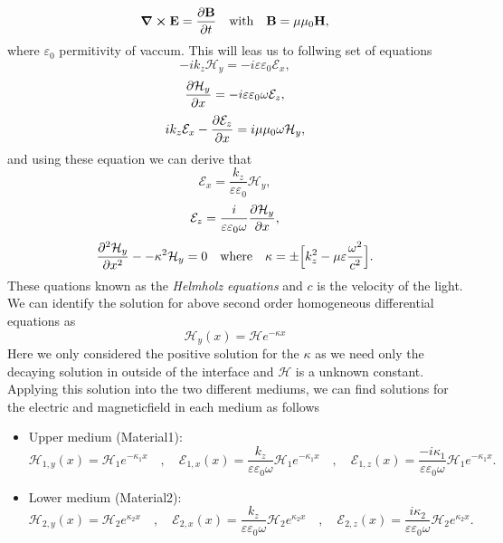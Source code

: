 \documentclass[a4paper]{article}
\numberwithin{equation}{subsection}
\numberwithin{equation}{section}
\begin{document}
\begin{equation}
  \curl{\vb{E}} = \pdv{\vb{B}}{t}\quad \text{with} \quad
  \vb{B} = \mu \mu_0 \vb{H},
\end{equation}
where $\varepsilon_0$ permitivity of vaccum. This will leas us to follwing set of equations
\begin{equation}
  -ik_z \mathcal{H}_y = -i \varepsilon \varepsilon_0 \mathcal{E}_x,
\end{equation}
\begin{equation}
  \pdv{\mathcal{H}_y}{x} = -i \varepsilon \varepsilon_0 \omega \mathcal{E}_z,
\end{equation}
\begin{equation}
  ik_z \mathcal{E}_x - \pdv{\mathcal{E}_z}{x} =
  i \mu \mu_0 \omega \mathcal{H}_y,
\end{equation}
and using these equation we can derive that
\begin{equation}
  \mathcal{E}_x = \frac{k_z }{\varepsilon \varepsilon_0} \mathcal{H}_y,
\end{equation}
\begin{equation}
  \mathcal{E}_z = \frac{i}{\varepsilon \varepsilon_0 \omega}
  \pdv{\mathcal{H}_y}{x},
\end{equation}
\begin{equation}
  \pdv[2]{\mathcal{H}_y}{x} -
  - \kappa^2 \mathcal{H}_y = 0 \quad
  \text{where} \quad
  \kappa = \pm\Big[k_z^2 - \mu\varepsilon \frac{\omega^2}{c^2}\Big].
\end{equation}
These quations known as the \textit{Helmholz equations} and $c$ is the velocity of the light. We can identify the solution for above second order homogeneous differential equations as
\begin{equation}
  {\mathcal{H}_{y}}(x) = \mathcal{H} e^{-\kappa x}
\end{equation}
Here we only considered the positive solution for the $\kappa$ as we need only the decaying solution in outside of the interface and $\mathcal{H}$ is a unknown constant. Applying this solution into the two different mediums, we can find solutions for the electric and magneticfield in each medium as follows
\begin{itemize}
  \item Upper medium (Material1):\\
  \begin{equation}
    {\mathcal{H}_{1,y}}(x) = \mathcal{H}_1 e^{-\kappa_1 x} \quad,\quad
    {\mathcal{E}_{1,x}}(x) = \frac{k_z}{\varepsilon \varepsilon_0 \omega}\mathcal{H}_1 e^{-\kappa_1 x} \quad,\quad
    {\mathcal{E}_{1,z}}(x) = \frac{-i\kappa_1}{\varepsilon \varepsilon_0 \omega}\mathcal{H}_1 e^{-\kappa_1 x}.
    \end{equation}
    \item Lower medium (Material2):\\
    \begin{equation}
      {\mathcal{H}_{2,y}}(x) = \mathcal{H}_2 e^{\kappa_2 x} \quad,\quad
      {\mathcal{E}_{2,x}}(x) = \frac{k_z}{\varepsilon \varepsilon_0 \omega}\mathcal{H}_2 e^{\kappa_2 x} \quad,\quad
      {\mathcal{E}_{2,z}}(x) = \frac{i \kappa_2}{\varepsilon \varepsilon_0 \omega}\mathcal{H}_2 e^{\kappa_2 x}.
  \end{equation}
\end{itemize}
\end{document}
